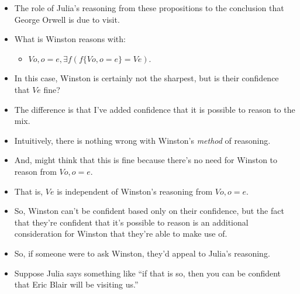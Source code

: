 \documentclass[10pt]{article}
\newcommand{\hozlinedash}[0]{%
  \noindent\hdashrule[0.5ex][c]{\textwidth}{.1pt}{2.5pt}
}
\begin{document}
\hozlinedash

\begin{itemize}
\item The role of Julia's reasoning from these propositions to the conclusion that George Orwell is due to visit.
\end{itemize}

\begin{itemize}
\item What is Winston reasons with:
  \begin{itemize}
  \item \(Vo, o = e, \exists f(f\{Vo, o = e\} = Ve)\).
  \end{itemize}
\item In this case, Winston is certainly not the sharpest, but is their confidence that \(Ve\) fine?
\item The difference is that I've added confidence that it is possible to reason to the mix.
\item Intuitively, there is nothing wrong with Winston's \emph{method} of reasoning.
\item And, might think that this is fine because there's no need for Winston to reason from \(Vo, o = e\).
\item That is, \(Ve\) is independent of Winston's reasoning from \(Vo, o = e\).
\item So, Winston can't be confident based only on their confidence, but the fact that they're confident that it's possible to reason is an additional consideration for Winston that they're able to make use of.
\end{itemize}

\begin{itemize}
\item So, if someone were to ask Winston, they'd appeal to Julia's reasoning.
\end{itemize}

\begin{itemize}
\item Suppose Julia says something like ``if that is so, then you can be confident that Eric Blair will be visiting us.''
\end{itemize}
\end{document}
